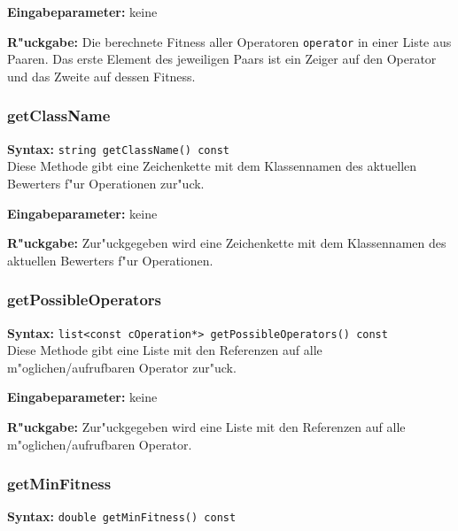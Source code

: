 \bigskip\noindent
\textbf{Eingabeparameter:} keine

\bigskip\noindent
\textbf{R"uckgabe:} Die berechnete Fitness aller Operatoren \verb|operator| in einer Liste aus Paaren. Das erste Element des jeweiligen Paars ist ein Zeiger auf den Operator und das Zweite auf dessen Fitness.


\subsubsection{getClassName}

\textbf{Syntax:} \verb|string getClassName() const| \\

Diese Methode gibt eine Zeichenkette mit dem Klassennamen des aktuellen Bewerters f"ur Operationen zur"uck.

\bigskip\noindent
\textbf{Eingabeparameter:} keine

\bigskip\noindent
\textbf{R"uckgabe:} Zur"uckgegeben wird eine Zeichenkette mit dem Klassennamen des aktuellen Bewerters f"ur Operationen.


\subsubsection{getPossibleOperators}
\label{secCOperationFitnessAlgorithmus_getPossibleOperators}

\textbf{Syntax:} \verb|list<const cOperation*> getPossibleOperators() const| \\

Diese Methode gibt eine Liste mit den Referenzen auf alle m"oglichen/aufrufbaren Operator zur"uck.

\bigskip\noindent
\textbf{Eingabeparameter:} keine

\bigskip\noindent
\textbf{R"uckgabe:} Zur"uckgegeben wird eine Liste mit den Referenzen auf alle m"oglichen/aufrufbaren Operator.


\subsubsection{getMinFitness}

\textbf{Syntax:} \verb|double getMinFitness() const| \\

